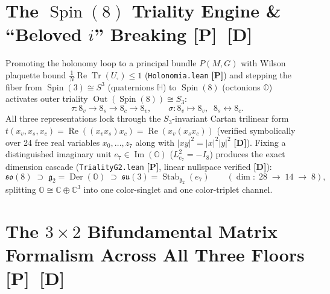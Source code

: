 \documentclass[11pt,a4paper]{article}
\newcommand{\badgeP}{\textbf{\color{sqJade}[P]}}
\newcommand{\badgeD}{\textbf{\color{sqRose}[D]}}
\theoremstyle{definition}
\begin{document}
\section{The $\operatorname{Spin}(8)$ Triality Engine \& ``Beloved $i$'' Breaking \badgeP\ \badgeD}

Promoting the holonomy loop to a principal bundle $P(M,G)$ with Wilson plaquette bound $\frac{1}{N}\operatorname{Re}\operatorname{Tr}(U_\square) \le 1$ (\texttt{Holonomia.lean} \badgeP) and stepping the fiber from $\operatorname{Spin}(3)\cong S^3$ (quaternions $\mathbb{H}$) to $\operatorname{Spin}(8)$ (octonions $\mathbb{O}$)~\cite{Baez2002} activates outer triality $\operatorname{Out}(\operatorname{Spin}(8))\cong S_3$:
\begin{equation}
  \tau : 8_v \longrightarrow 8_s \longrightarrow 8_c \longrightarrow 8_v, \qquad \sigma : 8_v \mapsto 8_v,\;\; 8_s \leftrightarrow 8_c.
\end{equation}
All three representations lock through the $S_3$-invariant Cartan trilinear form $t(x_v,x_s,x_c) = \operatorname{Re}((x_v x_s)x_c) = \operatorname{Re}(x_v(x_s x_c))$ (verified symbolically over 24 free real variables $x_0,\dots,z_7$ along with $|xy|^2 = |x|^2|y|^2$ \badgeD). Fixing a distinguished imaginary unit $e_7 \in \operatorname{Im}(\mathbb{O})$ ($L_{e_7}^2 = -I_8$) produces the exact dimension cascade (\texttt{TrialityG2.lean} \badgeP, linear nullspace verified \badgeD):
\begin{equation}
  \mathfrak{so}(8) \;\supset\; \mathfrak{g}_2 = \operatorname{Der}(\mathbb{O}) \;\supset\; \mathfrak{su}(3) = \operatorname{Stab}_{\mathfrak{g}_2}(e_7)
  \qquad (\dim:\; 28 \;\longrightarrow\; 14 \;\longrightarrow\; 8),
\end{equation}
splitting $\mathbb{O} \cong \mathbb{C} \oplus \mathbb{C}^3$ into one color-singlet and one color-triplet channel.

\section{The $3\times 2$ Bifundamental Matrix Formalism Across All Three Floors \badgeP\ \badgeD}
\end{document}
